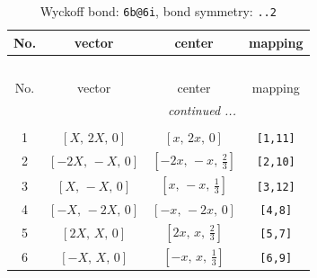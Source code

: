 \documentclass[fleqn,8pt]{jsarticle}
\begin{document}
\begin{longtable}{cccc}
\caption{Wyckoff bond: {\tt 6b@6i}, bond symmetry: {\tt ..2}}
 \\
 \hline \hline
No. & vector & center & mapping \\ \hline \endfirsthead

\multicolumn{3}{l}{\tablename\ \thetable{}} \\
 \hline \hline
No. & vector & center & mapping \\ \hline \endhead

 \hline \hline
\multicolumn{3}{r}{\footnotesize\it continued ...} \\ \endfoot

 \hline \hline
\multicolumn{3}{r}{} \\ \endlastfoot

1 & $\left[ X,\, 2 X,\, 0 \right]$ & $\left[ x,\, 2 x,\, 0 \right]$ & {\tt [1,11]} \\ \hline
2 & $\left[ - 2 X,\, - X,\, 0 \right]$ & $\left[ - 2 x,\, - x,\, \frac{2}{3} \right]$ & {\tt [2,10]} \\ \hline
3 & $\left[ X,\, - X,\, 0 \right]$ & $\left[ x,\, - x,\, \frac{1}{3} \right]$ & {\tt [3,12]} \\ \hline
4 & $\left[ - X,\, - 2 X,\, 0 \right]$ & $\left[ - x,\, - 2 x,\, 0 \right]$ & {\tt [4,8]} \\ \hline
5 & $\left[ 2 X,\, X,\, 0 \right]$ & $\left[ 2 x,\, x,\, \frac{2}{3} \right]$ & {\tt [5,7]} \\ \hline
6 & $\left[ - X,\, X,\, 0 \right]$ & $\left[ - x,\, x,\, \frac{1}{3} \right]$ & {\tt [6,9]} \\
\end{longtable}
\renewcommand{\arraystretch}{1.2}
\end{document}
